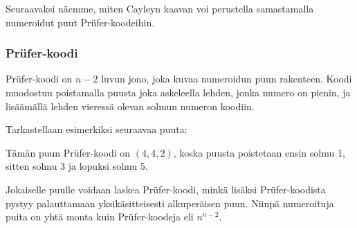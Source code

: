 Seuraavaksi näemme, miten Cayleyn kaavan
voi perustella samastamalla numeroidut puut
Prüfer-koodeihin.

\subsubsection{Prüfer-koodi}


Prüfer-koodi on $n-2$ luvun jono,
joka kuvaa numeroidun puun rakenteen.
Koodi muodostuu poistamalla puusta
joka askeleella lehden, jonka numero on pienin,
ja lisäämällä lehden vieressä olevan solmun
numeron koodiin.

Tarkastellaan esimerkiksi seuraavaa puuta:

\begin{center}
\end{center}
Tämän puun Prüfer-koodi on $(4,4,2)$,
koska puusta poistetaan ensin solmu 1,
sitten solmu 3 ja lopuksi solmu 5.

Jokaiselle puulle voidaan laskea
Prüfer-koodi, minkä lisäksi
Prüfer-koodista pystyy palauttamaan
yksikäsitteisesti alkuperäisen puun.
Niinpä numeroituja puita on yhtä monta
kuin Prüfer-koodeja eli $n^{n-2}$.